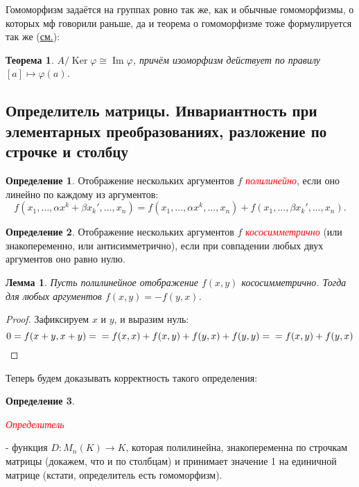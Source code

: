 \documentclass[a4paper,100pt]{article}
\theoremstyle{indented}
\newtheorem{theorem}{Теорема}
\newtheorem{lemma}{Лемма}
\theoremstyle{definition}
\newtheorem{defn}{Определение}
\theoremstyle{remark}
\DeclareMathOperator{\Ker}{Ker}
\DeclareMathOperator{\Imf}{Im}
\begin{document}
Гомоморфизм задаётся на группах ровно так же, как и обычные гомоморфизмы, о которых мф говорили раньше, да и теорема о гомоморфизме тоже формулируется так же (\hyperlink{n25}{см.}):

\begin{theorem}
    $A/\Ker \varphi \cong \Imf \varphi$, причём изоморфизм действует по правилу $[a]\mapsto \varphi(a)$.
\end{theorem}

\resetall

\subsection{Определитель матрицы. Инвариантность при элементарных преобразованиях, разложение по строчке и столбцу}

\begin{defn}
    Отображение нескольких аргументов $f$ \hypertarget{n95}{\textcolor{red}{\textit{полилинейно}}}, если оно линейно по каждому из аргументов:
    \[
        f(x_1, \dots, \alpha x^k+\beta x_k', \dots, x_n)=f(x_1, \dots, \alpha x^k, \dots, x_n)+f(x_1, \dots, \beta x_k', \dots, x_n).
    \]
\end{defn}

\begin{defn}
    Отображение нескольких аргументов $f$ \hypertarget{n96}{\textcolor{red}{\textit{кососимметрично}}} (или знакопеременно, или антисимметрично), если при совпадении любых двух аргументов оно равно нулю.
\end{defn}

\begin{lemma}
    Пусть полилинейное отображение $f(x, y)$ кососимметрично. Тогда для любых аргументов $f(x, y)=-f(y,x)$.
\end{lemma}

\begin{proof}
    Зафиксируем $x$ и $y$, и выразим нуль:
    \[
        0=f(x+y, x+y) = \\
        = f(x, x)+f(x, y)+f(y, x)+f(y, y) = \\
        = f(x, y)+f(y, x)
    \]
\end{proof}

Теперь будем доказывать корректность такого определения:

\begin{defn}
    \hypertarget{n97}{\textcolor{red}{\textit{Определитель}}} - функция $D:M_n(K)\rightarrow K$, которая полилинейна, знакопеременна по строчкам матрицы (докажем, что и по столбцам) и принимает значение 1 на единичной матрице (кстати, определитель есть гомоморфизм).
\end{defn}
\end{document}
